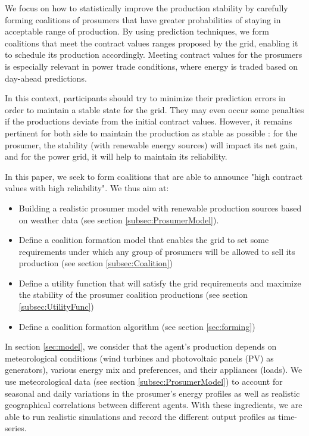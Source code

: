\documentclass[conference]{IEEEtran}
\begin{document}
We focus on how to statistically improve the production stability by carefully forming coalitions of prosumers that have greater probabilities of staying in acceptable range of production. By using prediction techniques, we form coalitions that meet the contract values ranges proposed by the grid, enabling it to schedule its production accordingly. Meeting contract values for the prosumers is especially relevant in power trade conditions, where energy is traded based on day-ahead predictions. 

In this context, participants should try to minimize their prediction errors in order to maintain a stable state for the grid. They may even occur some penalties if the productions deviate from the initial contract values. However, it remains pertinent for both side to maintain the production as stable as possible : for the prosumer, the stability (with renewable energy sources) will impact its net gain, and for the power grid, it will help to maintain its reliability.

In this paper, we seek to form coalitions that are able to announce "high contract values with high reliability". We thus aim at:
\begin{itemize}
\item Building a realistic prosumer model with renewable production sources based on weather data (see section \ref{subsec:ProsumerModel}).
\item Define a coalition formation model that enables the grid to set some requirements under which any group of prosumers will be allowed to sell its production (see section \ref{subsec:Coalition})
\item Define a utility function that will satisfy the grid requirements and maximize the stability of the prosumer coalition productions (see section \ref{subsec:UtilityFunc})
\item Define a coalition formation algorithm (see section \ref{sec:forming})
\end{itemize}

In section \ref{sec:model}, we consider that the agent's production depends on meteorological conditions (wind turbines and photovoltaic panels (PV) as generators), various energy mix and preferences, and their appliances (loads). We use meteorological data (see section \ref{subsec:ProsumerModel}) to account for seasonal and daily variations in the prosumer's energy profiles as well as realistic geographical correlations between different agents. With these ingredients, we are able to run realistic simulations and record the different output profiles as time-series.
\end{document}
